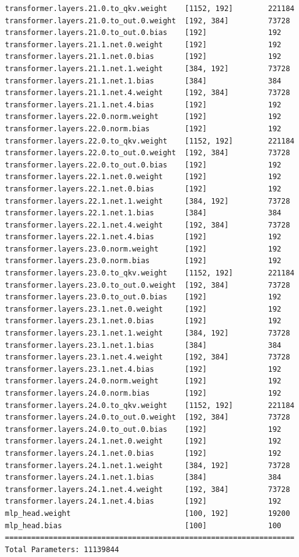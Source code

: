\documentclass[notitlepage,cs4size,punct,oneside]{ctexrep}
\numberwithin{equation}{chapter}
\theoremstyle{mystyle}
\begin{document}
\begin{appendices}
{\begin{lstlisting}[style=output]
transformer.layers.21.0.to_qkv.weight    [1152, 192]        221184
transformer.layers.21.0.to_out.0.weight  [192, 384]         73728
transformer.layers.21.0.to_out.0.bias    [192]              192
transformer.layers.21.1.net.0.weight     [192]              192
transformer.layers.21.1.net.0.bias       [192]              192
transformer.layers.21.1.net.1.weight     [384, 192]         73728
transformer.layers.21.1.net.1.bias       [384]              384
transformer.layers.21.1.net.4.weight     [192, 384]         73728
transformer.layers.21.1.net.4.bias       [192]              192
transformer.layers.22.0.norm.weight      [192]              192
transformer.layers.22.0.norm.bias        [192]              192
transformer.layers.22.0.to_qkv.weight    [1152, 192]        221184
transformer.layers.22.0.to_out.0.weight  [192, 384]         73728
transformer.layers.22.0.to_out.0.bias    [192]              192
transformer.layers.22.1.net.0.weight     [192]              192
transformer.layers.22.1.net.0.bias       [192]              192
transformer.layers.22.1.net.1.weight     [384, 192]         73728
transformer.layers.22.1.net.1.bias       [384]              384
transformer.layers.22.1.net.4.weight     [192, 384]         73728
transformer.layers.22.1.net.4.bias       [192]              192
transformer.layers.23.0.norm.weight      [192]              192
transformer.layers.23.0.norm.bias        [192]              192
transformer.layers.23.0.to_qkv.weight    [1152, 192]        221184
transformer.layers.23.0.to_out.0.weight  [192, 384]         73728
transformer.layers.23.0.to_out.0.bias    [192]              192
transformer.layers.23.1.net.0.weight     [192]              192
transformer.layers.23.1.net.0.bias       [192]              192
transformer.layers.23.1.net.1.weight     [384, 192]         73728
transformer.layers.23.1.net.1.bias       [384]              384
transformer.layers.23.1.net.4.weight     [192, 384]         73728
transformer.layers.23.1.net.4.bias       [192]              192
transformer.layers.24.0.norm.weight      [192]              192
transformer.layers.24.0.norm.bias        [192]              192
transformer.layers.24.0.to_qkv.weight    [1152, 192]        221184
transformer.layers.24.0.to_out.0.weight  [192, 384]         73728
transformer.layers.24.0.to_out.0.bias    [192]              192
transformer.layers.24.1.net.0.weight     [192]              192
transformer.layers.24.1.net.0.bias       [192]              192
transformer.layers.24.1.net.1.weight     [384, 192]         73728
transformer.layers.24.1.net.1.bias       [384]              384
transformer.layers.24.1.net.4.weight     [192, 384]         73728
transformer.layers.24.1.net.4.bias       [192]              192
mlp_head.weight                          [100, 192]         19200
mlp_head.bias                            [100]              100
==================================================================
Total Parameters: 11139844
\end{lstlisting}
}


\end{appendices}
\end{document}
